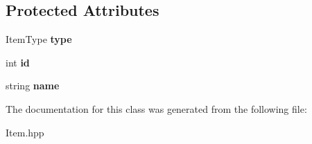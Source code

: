 \subsection*{Protected Attributes}
\begin{DoxyCompactItemize}
\item 
\mbox{\label{classItem_a3a58b8b450282d765d8ab445b7e6a4e3}} 
Item\+Type {\bfseries type}
\item 
\mbox{\label{classItem_ae901ac3ab2273113f746340a7db4e388}} 
int {\bfseries id}
\item 
\mbox{\label{classItem_a406cde7962a6b42a66b4a53c9a26db2c}} 
string {\bfseries name}
\end{DoxyCompactItemize}


The documentation for this class was generated from the following file\+:\begin{DoxyCompactItemize}
\item 
Item.\+hpp\end{DoxyCompactItemize}
